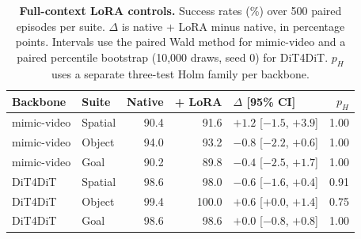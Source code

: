 \begin{table}[t]
  \centering
  \caption{\textbf{Full-context LoRA controls.}
  Success rates (\%) over 500 paired episodes per suite.
  $\Delta$ is native + LoRA minus native, in percentage points.
  Intervals use the paired Wald method for mimic-video and a paired percentile bootstrap (10,000 draws, seed 0) for DiT4DiT.
  $p_H$ uses a separate three-test Holm family per backbone.}
  \label{tab:native_lora_controls}
  \footnotesize
  \setlength{\tabcolsep}{3.5pt}
  \begin{tabular}{@{}llrrlr@{}}
    \toprule
    Backbone & Suite & Native & + LoRA & $\Delta$ [95\% CI] & $p_H$ \\
    \midrule
    mimic-video & Spatial & 90.4 & 91.6 & $+1.2$ [$-1.5$, $+3.9$] & 1.00 \\
    mimic-video & Object & 94.0 & 93.2 & $-0.8$ [$-2.2$, $+0.6$] & 1.00 \\
    mimic-video & Goal & 90.2 & 89.8 & $-0.4$ [$-2.5$, $+1.7$] & 1.00 \\
    \addlinespace[2pt]
    DiT4DiT & Spatial & 98.6 & 98.0 & $-0.6$ [$-1.6$, $+0.4$] & 0.91 \\
    DiT4DiT & Object & 99.4 & 100.0 & $+0.6$ [$+0.0$, $+1.4$] & 0.75 \\
    DiT4DiT & Goal & 98.6 & 98.6 & $+0.0$ [$-0.8$, $+0.8$] & 1.00 \\
    \bottomrule
  \end{tabular}
\end{table}
